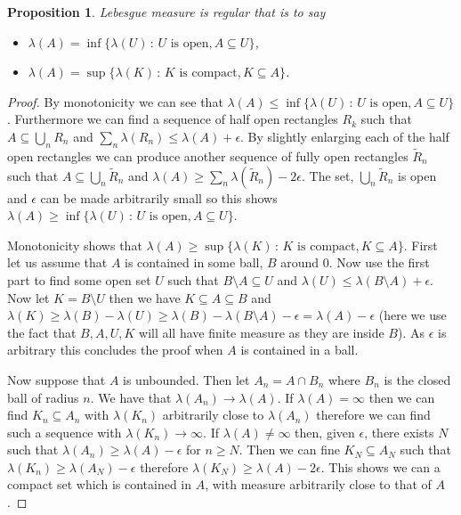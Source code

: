 \documentclass[11pt]{article}
\newtheorem{prp}[thm]{Proposition}
\theoremstyle{definition}
\theoremstyle{remark}
\begin{document}
\begin{prp}
Lebesgue measure is \emph{regular} that is to say
\begin{itemize}
\item $\lambda(A) = \inf \{ \lambda(U)\,:\, \mbox{$U$ is open}, A \subseteq U\}$,
\item $\lambda(A) = \sup \{ \lambda(K)\,:\, \mbox{$K$ is compact}, K \subseteq A\}$.
\end{itemize}
\end{prp}
\begin{proof}
By monotonicity we can see that $\lambda(A) \leq \inf \{ \lambda(U)\,:\, \mbox{$U$ is open}, A \subseteq U\}$. Furthermore we can find a sequence of half open rectangles $R_k$ such that $A \subseteq \bigcup_n R_n$ and $\sum_n \lambda(R_n) \leq \lambda(A) + \epsilon$. By slightly enlarging each of the half open rectangles we can produce another sequence of fully open rectangles $\tilde{R}_n$ such that $A \subseteq \bigcup_n \tilde{R}_n$ and $\lambda(A) \geq \sum_n \lambda(\tilde{R}_n)-2\epsilon$. The set, $\bigcup_n \tilde{R}_n$ is open and $\epsilon$ can be made arbitrarily small so this shows $\lambda(A) \geq \inf \{ \lambda(U)\,:\, \mbox{$U$ is open}, A \subseteq U\}$.

Monotonicity shows that $\lambda(A) \geq \sup \{ \lambda(K)\,:\, \mbox{$K$ is compact}, K \subseteq A\}$. First let us assume that $A$ is contained in some ball, $B$ around 0. Now use the first part to find some open set $U$ such that $B \setminus A \subseteq U$ and $\lambda(U) \leq \lambda(B \setminus A) + \epsilon$. Now let $K = B \setminus U$ then we have $K \subseteq A \subseteq B$ and $\lambda(K) \geq \lambda(B) - \lambda(U) \geq \lambda(B) - \lambda(B \setminus A) - \epsilon = \lambda(A) - \epsilon$ (here we use the fact that $B, A, U, K$ will all have finite measure as they are inside $B$). As $\epsilon$ is arbitrary this concludes the proof when $A$ is contained in a ball. 

Now suppose that $A$ is unbounded. Then let $A_n = A \cap B_n$ where $B_n$ is the closed ball of radius $n$. We have that $\lambda(A_n) \rightarrow \lambda(A)$. If $\lambda(A) = \infty$ then we can find $K_n \subseteq A_n$ with $\lambda(K_n)$ arbitrarily close to $\lambda(A_n)$ therefore we can find such a sequence with $\lambda(K_n) \rightarrow \infty$. If $\lambda(A) \neq \infty$ then, given $\epsilon$, there exists $N$ such that $\lambda(A_n) \geq \lambda(A)-\epsilon$ for $n \geq N$. Then we can fine $K_N \subseteq A_N$ such that $\lambda(K_n) \geq \lambda(A_N) - \epsilon$ therefore $\lambda(K_N) \geq \lambda(A)- 2 \epsilon$. This shows we can a compact set which is contained in $A$, with measure arbitrarily close to that of $A$. 
\end{proof}
\end{document}
